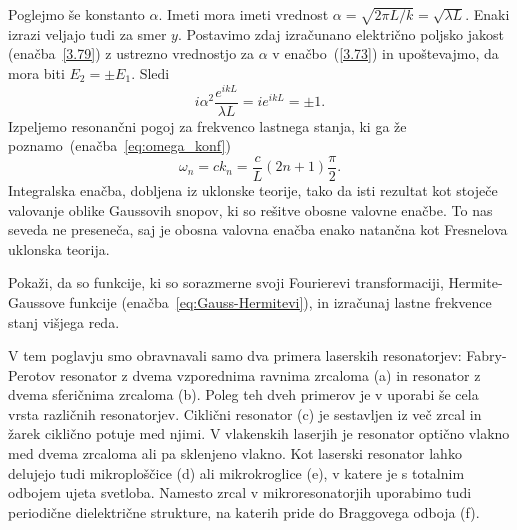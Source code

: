 Poglejmo še konstanto $\alpha$. Imeti mora imeti vrednost 
$\alpha = \sqrt{2\pi L/k}=\sqrt{\lambda L}$.
Enaki izrazi veljajo tudi za smer $y$. Postavimo zdaj izračunano električno 
poljsko jakost (enačba~\ref{3.79}) z ustrezno vrednostjo za $\alpha$ v 
enačbo~(\ref{3.73}) in upoštevajmo, da mora biti
$E_{2}=\pm E_{1}$. Sledi
\begin{equation}
i\alpha^{2}\frac{e^{ikL}}{\lambda L}=ie^{ikL}=\pm1.
\label{3.80}
\end{equation}
Izpeljemo resonančni pogoj za
frekvenco lastnega stanja, ki ga že poznamo~(enačba~\ref{eq:omega_konf})
\begin{equation}
\omega_{n}=ck_{n}=\frac{c}{L}(2n+1)\frac{\pi}{2}.
\label{3.81}
\end{equation}
Integralska enačba, dobljena iz uklonske teorije, tako da
isti rezultat kot stoječe valovanje oblike Gaussovih snopov, ki so
rešitve obosne valovne enačbe. To nas seveda ne preseneča, saj je
obosna valovna enačba enako natančna kot Fresnelova uklonska teorija.

\begin{definition}
Pokaži, da so funkcije, ki so sorazmerne svoji Fourierevi transformaciji, 
Hermite-Gaussove funkcije (enačba~\ref{eq:Gauss-Hermitevi}), in 
izračunaj lastne frekvence stanj višjega reda.
\end{definition}

\begin{remark}
V tem poglavju smo obravnavali samo dva primera laserskih resonatorjev: Fabry-Perotov
resonator z dvema vzporednima ravnima zrcaloma (a) in resonator z dvema sferičnima zrcaloma (b).
Poleg teh dveh primerov je v uporabi še cela vrsta različnih resonatorjev. Ciklični
resonator (c) je
sestavljen iz več zrcal in žarek ciklično potuje med njimi. V vlakenskih laserjih je resonator
optično vlakno med dvema zrcaloma ali pa sklenjeno vlakno. Kot laserski resonator lahko 
delujejo tudi mikroploščice (d) ali mikrokroglice (e), v katere je s totalnim odbojem ujeta svetloba. 
Namesto zrcal v mikroresonatorjih uporabimo tudi periodične dielektrične strukture, na katerih 
pride do Braggovega odboja (f). 
\end{remark}

\begin{figure}[h]
\centering
\def\svgwidth{130truemm} 

\label{fig:resonatorji}
\end{figure}

